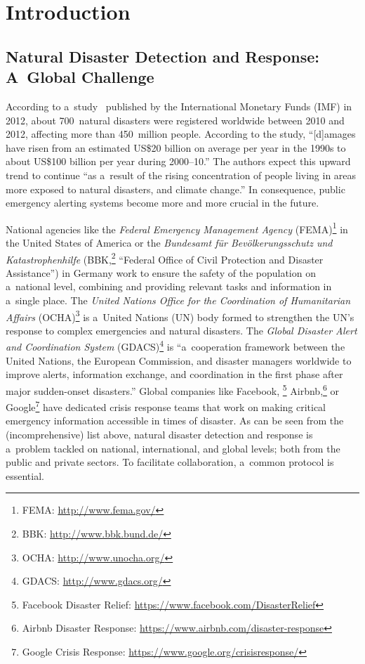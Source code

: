 \documentclass[runningheads,a4paper]{llncs}
\begin{document}
\section{Introduction}

\subsection{Natural Disaster Detection and Response: A~Global Challenge}
\label{sec:natural-disaster-detection}

According to a~study~\cite{laframboise2012naturaldisasters}
published by the International Monetary Funds (IMF) in 2012,
about 700~natural disasters were registered worldwide between 2010 and 2012,
affecting more than 450~million people.
According to the study, ``[d]amages have risen
from an estimated US\$20 billion on average per year
in the 1990s to about US\$100 billion per year during 2000--10.''
The authors expect this upward trend to continue
``as a~result of the rising concentration of people
living in areas more exposed to natural disasters,
and climate change.''
In consequence, public emergency alerting systems
become more and more crucial in the future.

National agencies like the
\emph{Federal Emergency Management Agency}
(FEMA)\footnote{FEMA: \url{http://www.fema.gov/}}
in the United States of America or the
\emph{Bundesamt für Bevölkerungsschutz und Katastrophenhilfe}
(BBK,\footnote{BBK: \url{http://www.bbk.bund.de/}}
``Federal Office of Civil Protection and Disaster Assistance'')
in Germany work to ensure the safety of the population
on a~national level, combining and providing relevant tasks
and information in a~single place.
The \emph{United Nations Office for the Coordination of Humanitarian Affairs}
(OCHA)\footnote{OCHA: \url{http://www.unocha.org/}}
is a~United Nations (UN) body formed to strengthen the UN's response
to complex emergencies and natural disasters.
The \emph{Global Disaster Alert and Coordination System}
(GDACS)\footnote{GDACS: \url{http://www.gdacs.org/}}
is ``a~cooperation framework between the United Nations,
the European Commission, and disaster managers worldwide
to improve alerts, information exchange, and coordination
in the first phase after major sudden-onset disasters.''
Global companies like Facebook,%
\footnote{Facebook Disaster Relief:
\url{https://www.facebook.com/DisasterRelief}}
Airbnb,\footnote{Airbnb Disaster Response:
\url{https://www.airbnb.com/disaster-response}} or
Google\footnote{Google Crisis Response:
\url{https://www.google.org/crisisresponse/}}
have dedicated crisis response teams that work on
making critical emergency information accessible in times of disaster.
As can be seen from the (incomprehensive) list above,
natural disaster detection and response is a~problem
tackled on national, international, and global levels;
both from the public and private sectors.
To facilitate collaboration, a~common protocol is essential.
\end{document}
